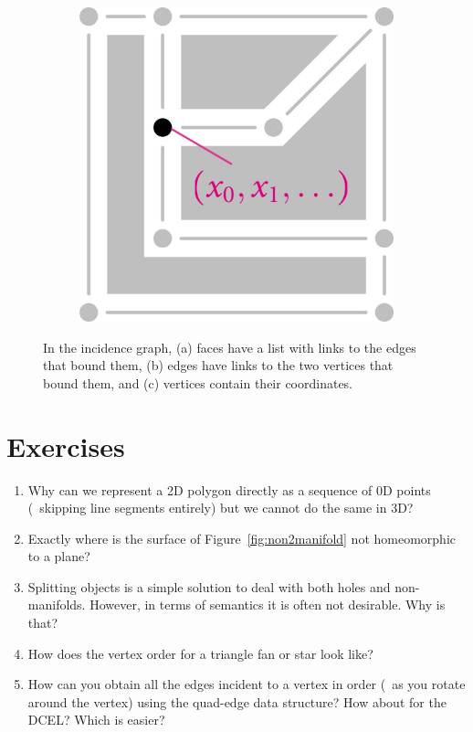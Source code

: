 \begin{figure}
\begin{subfigure}[b]{0.27\linewidth}
\caption{}%
\label{subfig:1-cell-boundary}
\end{subfigure}
\quad
\begin{subfigure}[b]{0.27\linewidth}
\includegraphics[width=\linewidth]{figs/0-cell-embedding}
\caption{}%
\label{subfig:0-cell-embedding}
\end{subfigure}
\caption{In the incidence graph, (a) faces have a list with links to the edges that bound them, (b) edges have links to the two vertices that bound them, and (c) vertices contain their coordinates.}%
\label{fig:incidencegraph}
\end{figure}

%
\section{Exercises}

\begin{enumerate}
	\item Why can we represent a 2D polygon directly as a sequence of 0D points (\ie\ skipping line segments entirely) but we cannot do the same in 3D\@?
	\item Exactly where is the surface of Figure~\ref{fig:non2manifold} not homeomorphic to a plane?
	\item Splitting objects is a simple solution to deal with both holes and non-manifolds. However, in terms of semantics it is often not desirable. Why is that?
	\item How does the vertex order for a triangle fan or star look like?
	\item How can you obtain all the edges incident to a vertex in order (\ie\ as you rotate around the vertex) using the quad-edge data structure? How about for the DCEL\@? Which is easier?
\end{enumerate}



